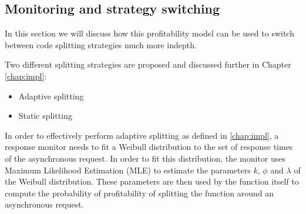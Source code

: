 \subsection{Monitoring and strategy switching}
\label{sec:faaas-monitoring-and-strat-switching-design}
In this section we will discuss how this profitability model can be used to switch between code splitting strategies much more indepth.

Two different splitting strategies are proposed and discussed further in Chapter \ref{chap:impl}:

\begin{itemize}
    \item Adaptive splitting
    \item Static splitting
\end{itemize}


In order to effectively perform adaptive splitting as defined in \ref{chap:impl}, a response monitor needs to fit a Weibull distribution to the set of response times of the asynchronous request. In order to fit this distribution, the monitor uses Maximum Likelihood Estimation (MLE) to estimate the parameters $k$, $\phi$ and $\lambda$ of the Weibull distribution. These parameters are then used by the function itself to compute the probability of profitability of splitting the function around an asynchronous request.
